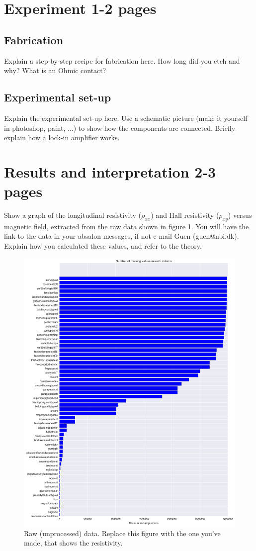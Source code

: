 \documentclass[a4paper]{article}
\begin{document}
\section{Experiment 1-2 pages}
\subsection{Fabrication}
Explain a step-by-step recipe for fabrication here. How long did you etch and why? What is an Ohmic contact?
\subsection{Experimental set-up}
Explain the experimental set-up here. Use a schematic picture (make it yourself in photoshop, paint, ...) to show how the components are connected. Briefly explain how a lock-in amplifier works.

\section{Results and interpretation 2-3 pages}
Show a graph of the longitudinal resistivity ($\rho_{xx}$) and Hall resistivity ($\rho_{xy}$) versus magnetic field, extracted from the raw data shown in figure \ref{fig:data}. You will have the link to the data in your absalon messages, if not e-mail Guen (guen@nbi.dk). Explain how you calculated these values, and refer to the theory.

\begin{figure}
\centering
\includegraphics[width=1\textwidth]{./img/prop-nan.png}
\caption{\label{fig:data}Raw (unprocessed) data. Replace this figure with the one you've made, that shows the resistivity.}
\end{figure}
\end{document}
